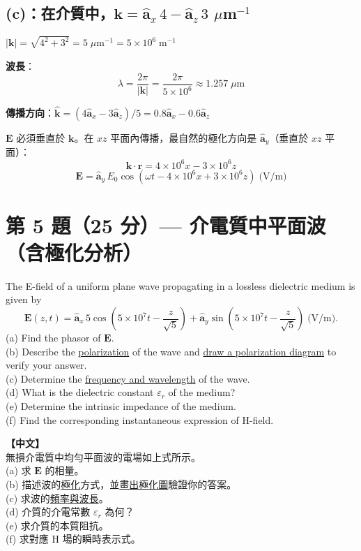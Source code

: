 \documentclass[12pt,a4paper]{article}
\newcommand{\vE}{\mathbf{E}}
\newcommand{\vk}{\mathbf{k}}
\newcommand{\ax}{\hat{\mathbf{a}}_x}
\newcommand{\ay}{\hat{\mathbf{a}}_y}
\newcommand{\az}{\hat{\mathbf{a}}_z}
\begin{document}
\subsection*{(c)：在介質中，$\vk = \ax\,4 - \az\,3$ \;$\mu$m$^{-1}$}

\begin{solutionbox}[詳解]

$|\vk| = \sqrt{4^2 + 3^2} = 5\;\mu\text{m}^{-1} = 5\times10^6\;\text{m}^{-1}$

\textbf{波長}：
\[
  \boxed{\lambda = \frac{2\pi}{|\vk|} = \frac{2\pi}{5\times10^6} \approx 1.257\;\mu\text{m}}
\]

\textbf{傳播方向}：$\hat{\vk} = (4\ax - 3\az)/5 = 0.8\ax - 0.6\az$

$\vE$ 必須垂直於 $\vk$。在 $xz$ 平面內傳播，最自然的極化方向是 $\ay$（垂直於 $xz$ 平面）：
\[
  \vk\cdot\mathbf{r} = 4\times10^6 x - 3\times10^6 z
\]
\[
  \boxed{\vE = \ay\,E_0\cos(\omega t - 4\times10^6 x + 3\times10^6 z) \;\text{(V/m)}}
\]
\end{solutionbox}

\section{第 5 題（25 分）— 介電質中平面波（含極化分析）}

\begin{questionbox}
The E-field of a uniform plane wave propagating in a lossless dielectric medium is given by
\[
  \vE(z,t) = \ax\,5\cos\!\left(5\times10^7 t - \frac{z}{\sqrt{5}}\right) + \ay\sin\!\left(5\times10^7 t - \frac{z}{\sqrt{5}}\right) \;\text{(V/m)}.
\]
(a) Find the phasor of $\vE$.\\
(b) Describe the \underline{polarization} of the wave and \underline{draw a polarization diagram} to verify your answer.\\
(c) Determine the \underline{frequency and wavelength} of the wave.\\
(d) What is the dielectric constant $\varepsilon_r$ of the medium?\\
(e) Determine the intrinsic impedance of the medium.\\
(f) Find the corresponding instantaneous expression of H-field.

\medskip\noindent\textbf{【中文】}\\
無損介電質中均勻平面波的電場如上式所示。\\
(a) 求 $\vE$ 的相量。\\
(b) 描述波的\underline{極化}方式，並\underline{畫出極化圖}驗證你的答案。\\
(c) 求波的\underline{頻率與波長}。\\
(d) 介質的介電常數 $\varepsilon_r$ 為何？\\
(e) 求介質的本質阻抗。\\
(f) 求對應 H 場的瞬時表示式。
\end{questionbox}
\end{document}
